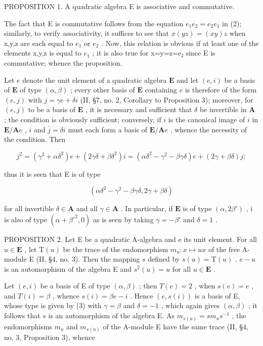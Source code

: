PROPOSITION 1. A quadratic algebra E is associative and commutative.

The fact that E is commutative follows from the equation \(e_{1}e_{2}=e_{2}e_{1}\) in (2); similarly, to verify associativity, it suffices to see that \(x(yz)=(xy)z\) when x,y,z are each equal to \(e_{1}\) or \(e_{2}\) . Now, this relation is obvious if at least one of the elements x,y,z is equal to \(e_{1}\) ; it is also true for x=y=z=e₂ since E is commutative; whence the proposition.

Let \(e\) denote the unit element of a quadratic algebra \(\mathbf{E}\) and let \((e, i)\) be a basis of \(\mathbf{E}\) of type \((\alpha, \beta)\) ; every other basis of \(\mathbf{E}\) containing \(e\) is therefore of the form \((e, j)\) with \(j = \gamma e + \delta i\) (II, §7, no. 2, Corollary to Proposition 3); moreover, for \((e, j)\) to be a basis of \(\mathbf{E}\) , it is necessary and sufficient that \(\delta\) be invertible in \(\mathbf{A}\) ; the condition is obviously sufficient; conversely, if \(i\) is the canonical image of \(i\) in \(\mathbf{E}/\mathbf{A}e\) , \(i\) and \(\bar{j} = \delta i\) must each form a basis of \(\mathbf{E}/\mathbf{A}e\) , whence the necessity of the condition. Then

\[
j ^ {2} = (\gamma^ {2} + \alpha \delta^ {2}) e + (2 \gamma \delta + \beta \delta^ {2}) i = (\alpha \delta^ {2} - \gamma^ {2} - \beta \gamma \delta) e + (2 \gamma + \beta \delta) j;
\]

thus it is seen that E is of type

\[
(\alpha \delta^ {2} - \gamma^ {2} - \beta \gamma \delta , 2 \gamma + \beta \delta)\tag{3}
\]

for all invertible \(\delta \in \mathbf{A}\) and all \(\gamma \in \mathbf{A}\) . In particular, if \(\mathbf{E}\) is of type \((\alpha, 2\beta')\) , i is also of type \((\alpha + \beta'^2, 0)\) as is seen by taking \(\gamma = -\beta'\) and \(\delta = 1\) .

PROPOSITION 2. Let E be a quadratic A-algebra and e its unit element. For all \(u \in \mathbf{E}\) , let \(\mathrm{T}(u)\) be the trace of the endomorphism \(m_u: x \mapsto ux\) of the free A-module E (II, §4, no. 3). Then the mapping \(s\) defined by \(s(u) = \mathrm{T}(u)\) . \(e - u\) is an automorphism of the algebra E and \(s^2(u) = u\) for all \(u \in \mathbf{E}\) .

Let \((e, i)\) be a basis of E of type \((\alpha, \beta)\) ; then \(T(e) = 2\) , when \(s(e) = e\) , and \(T(i) = \beta\) , whence \(s(i) = \beta e - i\) . Hence \((e, s(i))\) is a basis of E, whose type is given by (3) with \(\gamma = \beta\) and \(\delta = -1\) , which again gives \((\alpha, \beta)\) ; it follows that \(s\) is an automorphism of the algebra E. As \(m_{s(u)} = sm_u s^{-1}\) , the endomorphisms \(m_u\) and \(m_{s(u)}\) of the A-module E have the same trace (II, §4, no. 3, Proposition 3), whence

